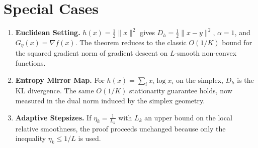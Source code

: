 \documentclass{article}
\newcommand{\grad}[1]{\nabla #1}
\begin{document}
\section*{Special Cases}
\begin{enumerate}
\item \textbf{Euclidean Setting.} $h(x)=\tfrac12\|x\|^{2}$ gives $D_h=\tfrac12\|x-y\|^{2}$, $\alpha=1$, and $G_{\eta}(x)=\grad{f}(x)$. The theorem reduces to the classic $O(1/K)$ bound for the squared gradient norm of gradient descent on $L$‑smooth non‑convex functions.
\item \textbf{Entropy Mirror Map.} For $h(x)=\sum_{i}x_i\log x_i$ on the simplex, $D_h$ is the KL divergence. The same $O(1/K)$ stationarity guarantee holds, now measured in the dual norm induced by the simplex geometry.
\item \textbf{Adaptive Stepsizes.} If $\eta_k = \frac{1}{L_k}$ with $L_k$ an upper bound on the local relative smoothness, the proof proceeds unchanged because only the inequality $\eta_k\le 1/L$ is used.
\end{enumerate}
\end{document}

